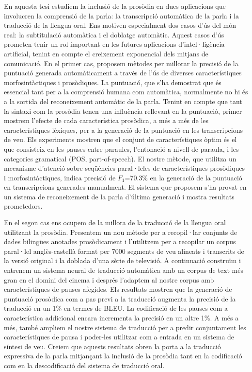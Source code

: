 En aquesta tesi estudiem la inclusió de la prosòdia en dues aplicacions que involucren la comprensió de la parla: la transcripció automàtica de la parla i la traducció de la llengua oral. Ens motiven especialment dos casos d’ús del món real: la subtitulació automàtica i el doblatge automàtic. Aquest casos d’ús prometen tenir un rol important en les futures aplicacions d’intel·ligència artificial, tenint en compte el creixement exponencial dels mitjans de comunicació. En el primer cas, proposem mètodes per millorar la precisió de la puntuació generada automàticament a través de l’ús de diverses característiques morfosintàctiques i prosòdiques. La puntuació, que s’ha demostrat que és essencial tant per a la comprensió humana com automàtica, normalmente no hi és a la sortida del reconeixement automàtic de la parla. Tenint en compte que tant la sintaxi com la prosòdia tenen una influència rellevant en la puntuació, primer mostrem l’efecte de cada característica prosòdica, a més a més de les característiques lèxiques, per a la generació de la puntuació en les transcripcions de veu. Els experiments mostren que el conjunt de característiques òptim és el que consisteix en les pauses entre paraules, l’entonació a nivell de paraula, i les categories gramatical (POS, part-of-speech). El nostre mètode, que utilitza un mecanisme d’atenció sobre seqüències paral·leles de característiques prosòdiques i morfosintàctiques, indica precisió de $F_1$=70.3\% en la generació de la puntuació en transcripcions generades manualment. El sistema que proposem s’ha provat en un sistema de reconeixement de la parla d’última generació i mostra resultats prometedors. 

En el segon cas ens ocupem de la millora de la traducció de la llengua oral utilitzant la prosòdia. Presentem un nou mètode per a recopil·lar conjunts de dades bilingües anotades prosòdicament i l’utilitzem per a recopilar un corpus paral·lel anglès-castellà format per 7000 segments de veu alineats i transcrits de la versió original i la doblada d’una sèrie de televisió. A continuació construïm i entrenem un sistema neural de traducció automàtica amb un corpus de text més gran en el domini del cinema i després l’adaptem al nostre corpus amb característiques de pauses afegides. Els resultats mostren que la generació de puntuació prosòdica com a pas previ a la traducció augmenta la precisió de la traducció en un 1\% en termes de BLEU. La codificació de les pauses com a característica addicional encara incrementa la precisió en un altre 1\%. A més a més, també ampliem el nostre sistema de traducció per a predir conjuntament les característiques de pausa i poder-les utilitzar com a entrada en un sistema de síntesi de veu. Creiem que aquests resultats obren la porta a la traducció expressiva de la parla mitjançant la inclusió de la prosòdia tant en la codificació com en la descodificació del sistema de traducció oral.


